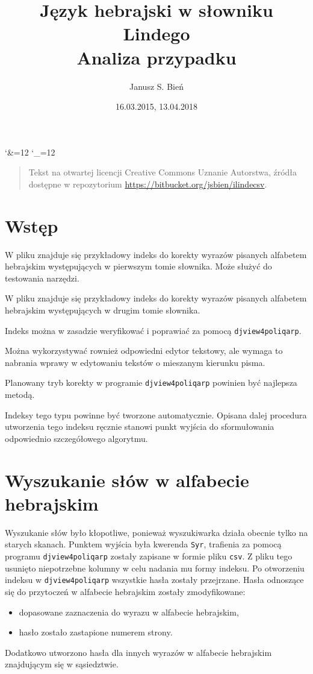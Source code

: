 \documentclass[12]{mwart}
\title{Język hebrajski w słowniku Lindego\\Analiza przypadku}
\author{Janusz S. Bień}
\date{16.03.2015, 13.04.2018}
\begin{document}
\maketitle

\catcode`\&=12
\catcode`\_=12

\begin{quote}
  Tekst na otwartej licencji Creative Commons Uznanie Autorstwa,
  źródła dostępne w repozytorium
  \url{https://bitbucket.org/jsbien/ilindecsv}.
\end{quote}

\section{Wstęp}
\label{sec:wstp}

W pliku  znajduje się przykładowy indeks do korekty
wyrazów pisanych alfabetem hebrajskim występujących w pierwszym tomie
słownika. Może służyć do testowania narzędzi.

W pliku  znajduje się przykładowy indeks do korekty
wyrazów pisanych alfabetem hebrajskim występujących w drugim tomie
słownika.

Indeks można w zasadzie weryfikować i poprawiać za pomocą
\texttt{djview4poliqarp}.

Można wykorzystywać rownież odpowiedni edytor tekstowy, ale wymaga to
nabrania wprawy w edytowaniu tekstów o mieszanym kierunku pisma.

Planowany tryb korekty w programie \texttt{djview4poliqarp}
powinien być najlepsza metodą.

Indeksy tego typu powinne być tworzone automatycznie. Opisana dalej
procedura utworzenia tego indeksu ręcznie stanowi punkt wyjścia do
sformułowania odpowiednio szczegółowego algorytmu.

\section{Wyszukanie słów w alfabecie hebrajskim}
\label{sec:wyszukanie-sow-w}

Wyszukanie słów było kłopotliwe, ponieważ wyszukiwarka działa obecnie
tylko na starych skanach. Punktem wyjścia była kwerenda \texttt{Syr},
trafienia za pomocą programu \texttt{djview4poliqarp} zostały zapisane
w formie pliku \texttt{csv}. Z pliku tego usunięto niepotrzebne
kolumny w celu nadania mu formy indeksu. Po otworzeniu indeksu w
\texttt{djview4poliqarp} wszystkie hasła zostały przejrzane. Hasła
odnoszące się do przytoczeń w alfabecie hebrajskim zostały
zmodyfikowane:
\begin{itemize}
\item dopasowane zaznaczenia do wyrazu w alfabecie hebrajskim,
\item hasło zostało zastapione numerem strony.
\end{itemize}
Dodatkowo utworzono hasła dla innych wyrazów w alfabecie hebrajskim
znajdującym się w sąsiedztwie.
\end{document}
